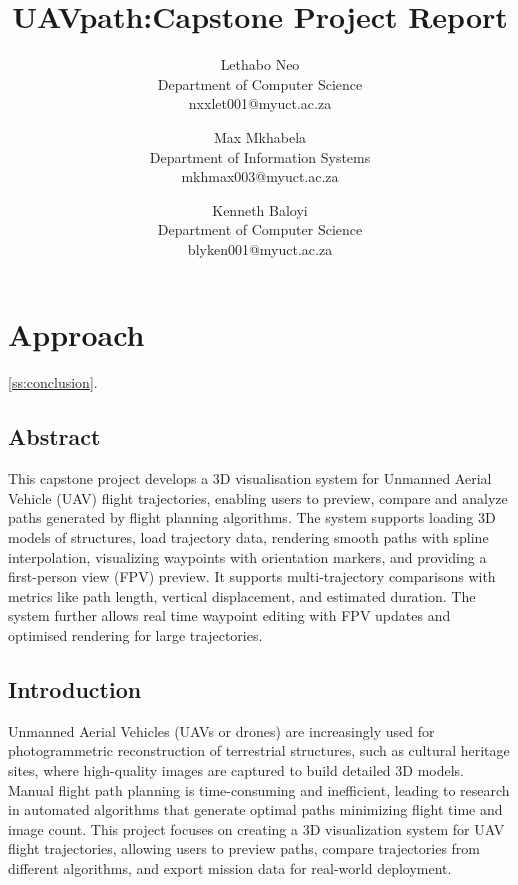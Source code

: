 \documentclass[11pt,a4paper]{article}
\begin{document}
\title{UAVpath:Capstone Project Report} \date{}
\author{Lethabo Neo\\Department of Computer Science\\nxxlet001@myuct.ac.za
\and Max Mkhabela\\Department of Information Systems\\mkhmax003@myuct.ac.za
\and Kenneth Baloyi\\Department of Computer Science\\blyken001@myuct.ac.za}
\cfoot{\thepage}
\chead{}
\rhead{\thepage}   %
\lfoot{}

\rfoot{}
\renewcommand{\headrulewidth}{0.0pt}   %

\maketitle
\thispagestyle{plain}  %

\section{Approach}

\ref{ss:conclusion}.

\subsection*{Abstract}
This capstone project develops a 3D visualisation system for Unmanned Aerial Vehicle (UAV) flight trajectories, enabling users to preview, compare and analyze paths generated by flight planning algorithms. The system supports loading 3D models of structures, load trajectory data, rendering smooth paths with spline interpolation, visualizing waypoints with orientation markers, and providing a first-person view (FPV) preview. It supports multi-trajectory comparisons with metrics like path length, vertical displacement, and estimated duration. The system further allows real time waypoint editing with FPV updates and optimised rendering for large trajectories. 

\subsection{Introduction}
\label{ss:introduction}
Unmanned Aerial Vehicles (UAVs or drones) are increasingly used for photogrammetric reconstruction of terrestrial structures, such as cultural heritage sites, where high-quality images are captured to build detailed 3D models. Manual flight path planning is time-consuming and inefficient, leading to research in automated algorithms that generate optimal paths minimizing flight time and image count. This project focuses on creating a 3D visualization system for UAV flight trajectories, allowing users to preview paths, compare trajectories from different algorithms, and export mission data for real-world deployment.
\end{document}
